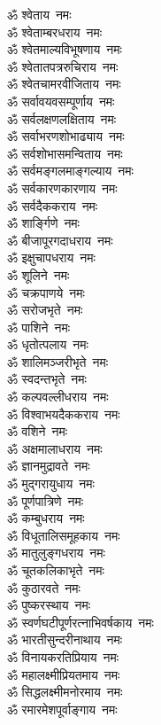 \begin{multicols}{2}
\begin{flushleft}
ॐ श्वेताय~नमः\hfill{}\\
ॐ श्वेताम्बरधराय~नमः\\
ॐ श्वेतमाल्यविभूषणाय~नमः\\
ॐ श्वेतातपत्ररुचिराय~नमः\\
ॐ श्वेतचामरवीजिताय~नमः\\
ॐ सर्वावयवसम्पूर्णाय~नमः\\
ॐ सर्वलक्षणलक्षिताय~नमः\\
ॐ सर्वाभरणशोभाढ्याय~नमः\\
ॐ सर्वशोभासमन्विताय~नमः\\
ॐ सर्वमङ्गलमाङ्गल्याय~नमः\\
ॐ सर्वकारणकारणाय~नमः\hfill{}\\
ॐ सर्वदैककराय~नमः\\
ॐ शार्ङ्गिणे~नमः\\
ॐ बीजापूरगदाधराय~नमः\\
ॐ इक्षुचापधराय~नमः\\
ॐ शूलिने~नमः\\
ॐ चक्रपाणये~नमः\\
ॐ सरोजभृते~नमः\\
ॐ पाशिने~नमः\\
ॐ धृतोत्पलाय~नमः\\
ॐ शालिमञ्जरीभृते~नमः\hfill{}\\
ॐ स्वदन्तभृते~नमः\\
ॐ कल्पवल्लीधराय~नमः\\
ॐ विश्वाभयदैककराय~नमः\\
ॐ वशिने~नमः\\
ॐ अक्षमालाधराय~नमः\\
ॐ ज्ञानमुद्रावते~नमः\\
ॐ मुद्गरायुधाय~नमः\\
ॐ पूर्णपात्रिणे~नमः\\
ॐ कम्बुधराय~नमः\\
ॐ विधूतालिसमूहकाय~नमः\hfill{}\\
ॐ मातुलुङ्गधराय~नमः\\
ॐ चूतकलिकाभृते~नमः\\
ॐ कुठारवते~नमः\\
ॐ पुष्करस्थाय~नमः\\
ॐ स्वर्णघटीपूर्णरत्नाभिवर्षकाय~नमः\\
ॐ भारतीसुन्दरीनाथाय~नमः\\
ॐ विनायकरतिप्रियाय~नमः\\
ॐ महालक्ष्मीप्रियतमाय~नमः\\
ॐ सिद्धलक्ष्मीमनोरमाय~नमः\\
ॐ रमारमेशपूर्वाङ्गाय~नमः\hfill{}\\

\end{flushleft}
\end{multicols}
